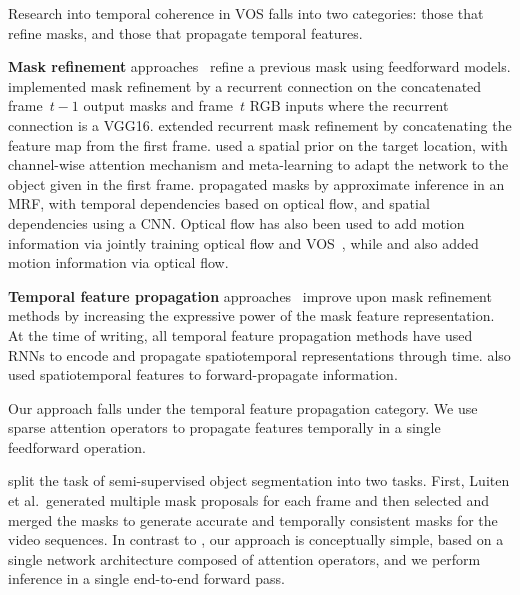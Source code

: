 Research into temporal coherence in VOS falls into two categories: those that
refine masks, and those that propagate temporal features.

\textbf{Mask refinement}
approaches~\citep{khoreva2017learning,oh2018fast,khoreva2017learning,hu2017maskrnn,jang2017online}
refine a previous mask using feedforward models.
\citet{khoreva2017learning} implemented mask refinement by a
recurrent connection on the concatenated frame~$t-1$ output masks and frame~$t$
RGB inputs where the recurrent connection is a VGG16.
\citet{oh2018fast} extended recurrent mask refinement by concatenating
the feature map from the first frame.
\citet{yang2018efficient} used a spatial prior on the target
location, with channel-wise attention mechanism and meta-learning to adapt the
network to the object given in the first frame.
\citet{bao2018cnn} propagated masks by approximate inference in an
MRF, with temporal dependencies based on optical flow, and spatial dependencies
using a CNN\@.
Optical flow has also been used to add motion information via jointly training
optical flow and VOS~\citep{cheng2017segflow},
while \citet{jain2017fusionseg} and \citet{hu2018motion}
also added motion information via optical flow.

\textbf{Temporal feature propagation}
approaches~\citep{tokmakov2017learning,xu2018youtube,hu2017maskrnn,salvador2017recurrent}
improve upon mask refinement methods by increasing the expressive power of the
mask feature representation.
At the time of writing, all temporal feature propagation methods have used RNNs
to encode and propagate spatiotemporal representations through time.
\citet{jampani2017video} also used spatiotemporal features to
forward-propagate information.

Our approach falls under the temporal feature propagation category.
We use sparse attention operators to propagate features temporally in a single
feedforward operation.



\citet{luiten2018premvos} split the task of semi-supervised object
segmentation into two tasks.
First, Luiten et al.\ generated multiple mask proposals for each frame and then
selected and merged the masks to generate accurate and temporally consistent
masks for the video sequences.
In contrast to \citet{luiten2018premvos}, our approach is
conceptually simple, based on a single network architecture composed of
attention operators, and we perform inference in a single end-to-end forward
pass.

